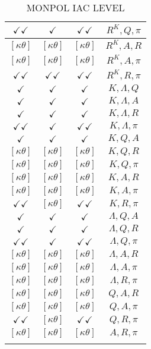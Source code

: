 \documentclass[a4paper,10pt]{article}
\begin{document}
\begin{longtable}{|c|c|c|c|}
\hline
$\checkmark\checkmark$ & $\checkmark$ & $\checkmark\checkmark$ & ${R^{K}},{Q},{\pi}$ \\
\hline
$[\kappa \theta ]$ & $[\kappa \theta ]$ & $[\kappa \theta ]$ & ${R^{K}},{A},{R}$ \\
\hline
$[\kappa \theta ]$ & $[\kappa \theta ]$ & $[\kappa \theta ]$ & ${R^{K}},{A},{\pi}$ \\
\hline
$\checkmark\checkmark$ & $\checkmark\checkmark$ & $\checkmark\checkmark$ & ${R^{K}},{R},{\pi}$ \\
\hline
$\checkmark$ & $\checkmark$ & $\checkmark$ & ${K},{\Lambda},{Q}$ \\
\hline
$\checkmark$ & $\checkmark$ & $\checkmark$ & ${K},{\Lambda},{A}$ \\
\hline
$\checkmark$ & $\checkmark$ & $\checkmark$ & ${K},{\Lambda},{R}$ \\
\hline
$\checkmark\checkmark$ & $\checkmark$ & $\checkmark\checkmark$ & ${K},{\Lambda},{\pi}$ \\
\hline
$\checkmark$ & $\checkmark$ & $\checkmark$ & ${K},{Q},{A}$ \\
\hline
$[\kappa \theta ]$ & $[\kappa \theta ]$ & $[\kappa \theta ]$ & ${K},{Q},{R}$ \\
\hline
$[\kappa \theta ]$ & $[\kappa \theta ]$ & $[\kappa \theta ]$ & ${K},{Q},{\pi}$ \\
\hline
$[\kappa \theta ]$ & $[\kappa \theta ]$ & $[\kappa \theta ]$ & ${K},{A},{R}$ \\
\hline
$[\kappa \theta ]$ & $[\kappa \theta ]$ & $[\kappa \theta ]$ & ${K},{A},{\pi}$ \\
\hline
$\checkmark\checkmark$ & $[\kappa \theta ]$ & $\checkmark\checkmark$ & ${K},{R},{\pi}$ \\
\hline
$\checkmark$ & $\checkmark$ & $\checkmark$ & ${\Lambda},{Q},{A}$ \\
\hline
$\checkmark$ & $\checkmark$ & $\checkmark$ & ${\Lambda},{Q},{R}$ \\
\hline
$\checkmark\checkmark$ & $\checkmark$ & $\checkmark\checkmark$ & ${\Lambda},{Q},{\pi}$ \\
\hline
$[\kappa \theta ]$ & $[\kappa \theta ]$ & $[\kappa \theta ]$ & ${\Lambda},{A},{R}$ \\
\hline
$[\kappa \theta ]$ & $[\kappa \theta ]$ & $[\kappa \theta ]$ & ${\Lambda},{A},{\pi}$ \\
\hline
$[\kappa \theta ]$ & $[\kappa \theta ]$ & $[\kappa \theta ]$ & ${\Lambda},{R},{\pi}$ \\
\hline
$[\kappa \theta ]$ & $[\kappa \theta ]$ & $[\kappa \theta ]$ & ${Q},{A},{R}$ \\
\hline
$[\kappa \theta ]$ & $[\kappa \theta ]$ & $[\kappa \theta ]$ & ${Q},{A},{\pi}$ \\
\hline
$\checkmark\checkmark$ & $[\kappa \theta ]$ & $\checkmark\checkmark$ & ${Q},{R},{\pi}$ \\
\hline
$[\kappa \theta ]$ & $[\kappa \theta ]$ & $[\kappa \theta ]$ & ${A},{R},{\pi}$ \\
\hline
\caption{MONPOL IAC LEVEL}
\label{table:MyTableLabel}
\end{longtable}
\end{document}
